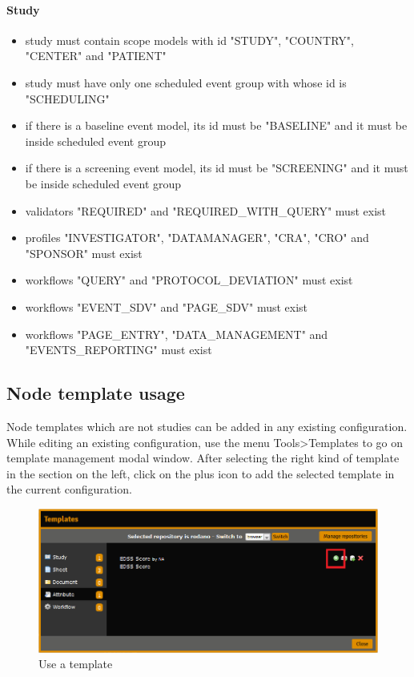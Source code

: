 \documentclass[11pt,a4paper,oneside]{article}
\begin{document}
\paragraph{Study}
\begin{itemize}
	\item study must contain scope models with id \mbox{"STUDY"}, \mbox{"COUNTRY"}, \mbox{"CENTER"} and \mbox{"PATIENT"}
	\item study must have only one scheduled event group with whose id is "SCHEDULING"
	\item if there is a baseline event model, its id must be "BASELINE" and it must be inside scheduled event group
	\item if there is a screening event model, its id must be "SCREENING" and it must be inside scheduled event group
	\item validators \mbox{"REQUIRED"} and \mbox{"REQUIRED\_WITH\_QUERY"} must exist
	\item profiles \mbox{"INVESTIGATOR"}, \mbox{"DATAMANAGER"}, \mbox{"CRA"}, \mbox{"CRO"} and \mbox{"SPONSOR"} must exist
	\item workflows \mbox{"QUERY"} and \mbox{"PROTOCOL\_DEVIATION"} must exist
	\item workflows \mbox{"EVENT\_SDV"} and \mbox{"PAGE\_SDV"} must exist
	\item workflows \mbox{"PAGE\_ENTRY"}, \mbox{"DATA\_MANAGEMENT"} and \mbox{"EVENTS\_REPORTING"} must exist
\end{itemize}

\subsection{Node template usage}

Node templates which are not studies can be added in any existing configuration.\\

While editing an existing configuration, use the menu Tools\textgreater Templates to go on template management modal window. After selecting the right kind of template in the section on the left, click on the plus icon to add the selected template in the current configuration.\\

\begin{figure}[h]
\caption{Use a template}
\includegraphics[width=\linewidth]{node_templates_use_template}
\end{figure}
\end{document}
